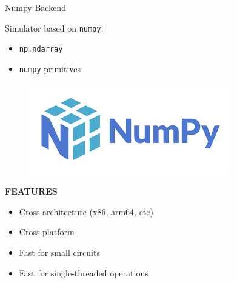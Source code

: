 \documentclass[11p,aspectratio=169]{beamer}
\begin{document}
\begin{frame}{Numpy Backend}
    \begin{multicols*}{2}
        Simulator based on \texttt{numpy}:
        \begin{itemize}
            \item \texttt{np.ndarray}
            \item \texttt{numpy} primitives 
        \end{itemize}
        \begin{figure}
            \includegraphics[width=0.3 \textwidth]{figures/numpy.png}
        \end{figure}
    \end{multicols*}
    
    
    \textbf{FEATURES}
    \begin{multicols*}{2}
        \begin{itemize}
            \item Cross-architecture (x86, arm64, etc)
            \item Cross-platform
            \item Fast for small circuits
            \item Fast for single-threaded operations
        \end{itemize}
    \end{multicols*}

    
\end{frame}
\end{document}
